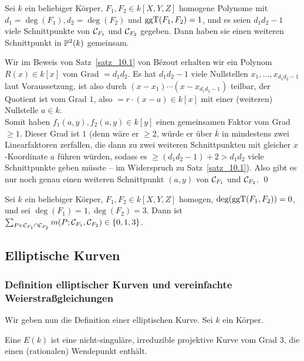 \begin{satz}
\label{satz_10.15}
	Sei $k$ ein beliebiger Körper, $F_1,F_2 \in k[X,Y,Z]$ homogene Polynome mit $d_1 = \deg(F_1), d_2 = \deg(F_2)$ und $\operatorname{ggT}(F_1,F_2) = 1$, und es seien $d_1d_2 - 1$ viele Schnittpunkte von $\mathcal{C}_{F_1}$ und $\mathcal{C}_{F_2}$ gegeben. 
	Dann haben sie einen weiteren Schnittpunkt in $\mathbb{P}^2(k)$ gemeinsam.
\end{satz}

	Wir im Beweis von Satz~\ref{satz_10.1} von Bézout erhalten wir ein Polynom $R(x) \in k[x]$ vom Grad $=d_1d_2$. 
	Es hat $d_1d_2-1$ viele Nullstellen $x_1, \dots, x_{d_1 d_2-1}$ laut Voraussetzung, ist also durch $(x-x_1) \cdots (x-x_{d_1d_2-1})$ teilbar, der Quotient ist vom Grad $1$, also $=r \cdot (x-a) \in k[x]$ mit einer (weiteren) Nullstelle $a \in k$.\\
	Somit haben $f_1(a,y), f_2(a,y) \in k[y]$ einen gemeinsamen Faktor vom Grad $\geq 1$. 
	Dieser Grad ist $1$ (denn wäre er $\geq 2$, würde er über $\overline{k}$ in mindestens zwei Linearfaktoren zerfallen, die dann zu zwei weiteren Schnittpunkten mit gleicher $x$-Koordinate $a$ führen würden, sodass es $\geq (d_1d_2-1)+2 > d_1d_2$ viele Schnittpunkte geben müsste -- im Widerspruch zu Satz~\ref{satz_10.1}). 
	Also gibt es nur noch genau einen weiteren Schnittpunkt $(a,y)$ von $\mathcal{C}_{F_1}$ und $\mathcal{C}_{F_2}$. \qed
	
\begin{bsp}
\label{bsp_10.16}
	Sei $k$ ein beliebiger Körper, $F_1,F_2 \in k[X,Y,Z]$ homogen, $\deg(\operatorname{ggT}(F_1,F_2)) = 0$, und sei $\deg(F_1) = 1, \deg(F_2) = 3$. 
	Dann ist $\sum_{P \in \mathcal{C}_{F_1} \cap \mathcal{C}_{F_2}} m(P;\mathcal{C}_{F_1},\mathcal{C}_{F_2}) \in \{0,1,3\}$.
\end{bsp}
	
\nextlecture
\newpage
\subsection{Elliptische Kurven}
\subsubsection{Definition elliptischer Kurven und vereinfachte Weierstraßgleichungen}
	Wir geben nun die Definition einer elliptischen Kurve. 
	Sei $k$ ein Körper. 
	\marginnote{[11]}
	
\begin{defn}
	Eine  $E(k)$ ist eine nicht-singuläre, irreduzible projektive Kurve vom Grad $3$, die einen (rationalen) Wendepunkt enthält.
\end{defn}
	
